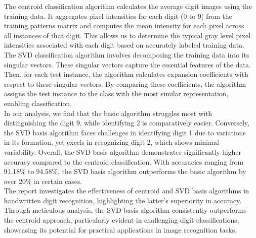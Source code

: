 \documentclass{article} %
\begin{document}
  \noindent The centroid classification algorithm calculates the average digit images using the training data. It aggregates pixel intensities for each digit (0 to 9) from the training patterns matrix and computes the mean intensity for each pixel across all instances of that digit. This allows us to determine the typical gray level pixel intensities associated with each digit based on accurately labeled training data. The SVD classification algorithm involves decomposing the training data into its singular vectors. These singular vectors capture the essential features of the data. Then, for each test instance, the algorithm calculates expansion coefficients with respect to these singular vectors. By comparing these coefficients, the algorithm assigns the test instance to the class with the most similar representation, enabling classification. \\

  \noindent In our analysis, we find that the basic algorithm struggles most with distinguishing the digit 9, while identifying 2 is comparatively easier. Conversely, the SVD basis algorithm faces challenges in identifying digit 1 due to variations in its formation, yet excels in recognizing digit 2, which shows minimal variability. Overall, the SVD basis algorithm demonstrates significantly higher accuracy compared to the centroid classification. With accuracies ranging from 91.18\% to 94.58\%, the SVD basis algorithm outperforms the basic algorithm by over 20\% in certain cases. \\

  \noindent The report investigates the effectiveness of centroid and SVD basis algorithms in handwritten digit recognition, highlighting the latter's superiority in accuracy. Through meticulous analysis, the SVD basis algorithm consistently outperforms the centroid approach, particularly evident in challenging digit classifications, showcasing its potential for practical applications in image recognition tasks.
\end{document}
